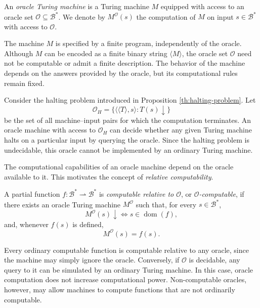 \begin{definition}
\label{def:Oracle-Turing-Machine}
An \emph{oracle Turing machine} is a Turing machine $M$ equipped with access to an oracle set $\mathcal{O}\subseteq\mathcal{B}^\ast$. We denote by $M^{\mathcal{O}}(s)$ the computation of $M$ on input $s\in\mathcal{B}^\ast$ with access to $\mathcal{O}$.
\end{definition}

The machine $M$ is specified by a finite program, independently of the oracle. Although $M$ can be encoded as a finite binary string $\langle M\rangle$, the oracle set $\mathcal{O}$ need not be computable or admit a finite description. The behavior of the machine depends on the answers provided by the oracle, but its computational rules remain fixed.

\begin{example}
Consider the halting problem introduced in Proposition \ref{th:halting-problem}. Let
\[
\mathcal{O}_H = \{\langle\langle T\rangle,s\rangle : T(s)\downarrow\}
\]
be the set of all machine--input pairs for which the computation terminates. An oracle machine with access to $\mathcal{O}_H$ can decide whether any given Turing machine halts on a particular input by querying the oracle. Since the halting problem is undecidable, this oracle cannot be implemented by an ordinary Turing machine.
\end{example}

The computational capabilities of an oracle machine depend on the oracle available to it. This motivates the concept of \emph{relative computability}.

\begin{definition}
A partial function $f:\mathcal{B}^\ast\rightharpoonup\mathcal{B}^\ast$ is \emph{computable relative to $\mathcal{O}$}, or \emph{$\mathcal{O}$-computable}, if there exists an oracle Turing machine $M^{\mathcal{O}}$ such that, for every $s\in\mathcal{B}^\ast$,
\[
M^{\mathcal{O}}(s)\downarrow \iff s\in\operatorname{dom}(f),
\]
and, whenever $f(s)$ is defined,
\[
M^{\mathcal{O}}(s)=f(s).
\]
\end{definition}

Every ordinary computable function is computable relative to any oracle, since the machine may simply ignore the oracle. Conversely, if $\mathcal{O}$ is decidable, any query to it can be simulated by an ordinary Turing machine. In this case, oracle computation does not increase computational power. Non-computable oracles, however, may allow machines to compute functions that are not ordinarily computable.

